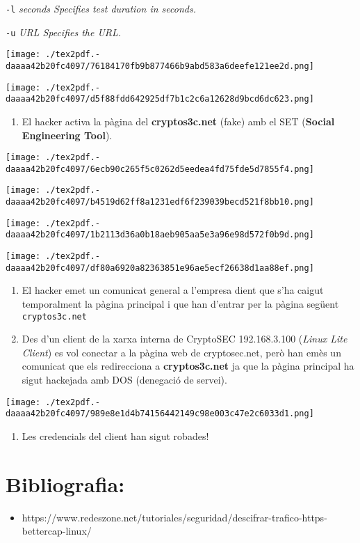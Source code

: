 \documentclass[]{article}
\providecommand{\tightlist}{%
  \setlength{\itemsep}{0pt}\setlength{\parskip}{0pt}}
\begin{document}
\texttt{-l} \emph{seconds Specifies test duration in seconds.}

\texttt{-u} \emph{URL Specifies the URL.}

\texttt{[image: ./tex2pdf.-daaaa42b20fc4097/76184170fb9b877466b9abd583a6deefe121ee2d.png]}

\texttt{[image: ./tex2pdf.-daaaa42b20fc4097/d5f88fdd642925df7b1c2c6a12628d9bcd6dc623.png]}

\begin{enumerate}
\def\labelenumi{\arabic{enumi}.}
\setcounter{enumi}{1}
\tightlist
\item
  El hacker activa la pàgina del \textbf{cryptos3c.net} (fake) amb el
  SET (\textbf{Social Engineering Tool}).
\end{enumerate}

\texttt{[image: ./tex2pdf.-daaaa42b20fc4097/6ecb90c265f5c0262d5eedea4fd75fde5d7855f4.png]}

\texttt{[image: ./tex2pdf.-daaaa42b20fc4097/b4519d62ff8a1231edf6f239039becd521f8bb10.png]}

\texttt{[image: ./tex2pdf.-daaaa42b20fc4097/1b2113d36a0b18aeb905aa5e3a96e98d572f0b9d.png]}

\texttt{[image: ./tex2pdf.-daaaa42b20fc4097/df80a6920a82363851e96ae5ecf26638d1aa88ef.png]}

\begin{enumerate}
\def\labelenumi{\arabic{enumi}.}
\setcounter{enumi}{2}
\item
  El hacker emet un comunicat general a l'empresa dient que s'ha caigut
  temporalment la pàgina principal i que han d'entrar per la pàgina
  següent \texttt{cryptos3c.net}
\item
  Des d'un client de la xarxa interna de CryptoSEC 192.168.3.100
  (\emph{Linux Lite Client}) es vol conectar a la pàgina web de
  cryptosec.net, però han emès un comunicat que els redirecciona a
  \textbf{cryptos3c.net} ja que la pàgina principal ha sigut hackejada
  amb DOS (denegació de servei).
\end{enumerate}

\texttt{[image: ./tex2pdf.-daaaa42b20fc4097/989e8e1d4b74156442149c98e003c47e2c6033d1.png]}

\begin{enumerate}
\def\labelenumi{\arabic{enumi}.}
\setcounter{enumi}{4}
\tightlist
\item
  Les credencials del client han sigut robades!
\end{enumerate}

\hypertarget{bibliografia}{%
\section{\texorpdfstring{\textbf{Bibliografia}:}{Bibliografia:}}\label{bibliografia}}

\begin{itemize}
\tightlist
\item
  https://www.redeszone.net/tutoriales/seguridad/descifrar-trafico-https-bettercap-linux/
\end{itemize}
\end{document}

